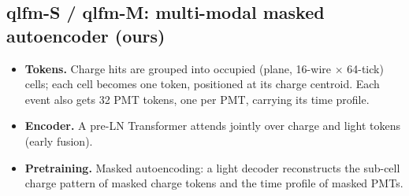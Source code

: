 \documentclass[11pt,a4paper]{article}
\begin{document}
\subsection{qlfm-S / qlfm-M: multi-modal masked autoencoder (ours)}
\begin{itemize}
  \item \textbf{Tokens.} Charge hits are grouped into occupied (plane, 16-wire $\times$ 64-tick) cells; each cell becomes one token, positioned at its charge centroid. Each event also gets 32 PMT tokens, one per PMT, carrying its time profile.
  \item \textbf{Encoder.} A pre-LN Transformer attends jointly over charge and light tokens (early fusion).
  \item \textbf{Pretraining.} Masked autoencoding: a light decoder reconstructs the sub-cell charge pattern of masked charge tokens and the time profile of masked PMTs.
\end{itemize}
\end{document}
